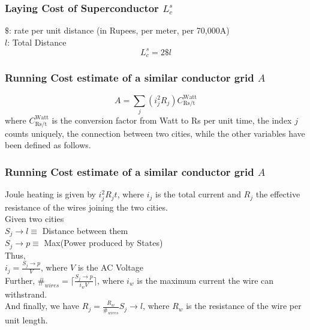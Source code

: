 \documentclass{beamer}
\begin{document}
		\begin{frame}
			\frametitle{Laying Cost of Superconductor $L^s_c$}
				$\$$: rate per unit distance (in Rupees, per meter, per 70,000A) \\
				$l$: Total Distance
				\begin{equation}
					L^s_c=2\$l
				\end{equation}
		\end{frame}
	
		\begin{frame}
			\frametitle{Running Cost estimate of a similar conductor grid $A$}
				\begin{equation}
					A=\sum_j(i_j^2R_j) C^{\text{Watt}}_{\text{Rs/t}}
				\end{equation}
				where $C^{\text{Watt}}_{\text{Rs/t}}$ is the conversion factor from Watt to Rs per unit time, the index $j$ counts uniquely, the connection between two cities, while the other variables have been defined as follows.\\
		\end{frame}

		\begin{frame}
			\frametitle{Running Cost estimate of a similar conductor grid $A$}
				Joule heating is given by $i_j^2R_jt$, where $i_j$ is the total current and $R_j$ the effective resistance of the wires joining the two cities.\\
				Given two cities\\
				$S_j \to l\equiv$ Distance between them\\
				$S_j \to p\equiv$ Max(Power produced by States)\\
				Thus,\\
				$i_j=\frac{S_j \to p}{V}$, where $V$ is the AC Voltage\\
				Further, $\#_{wires}=\lceil{\frac{S_j \to p}{i_wV}}\rceil$, where $i_w$ is the maximum current the wire can withstrand.\\
				And finally, we have $R_j=\frac{R_w}{\#_{wires}}S_j \to l$, where $R_w$ is the resistance of the wire per unit length.
		\end{frame}
\end{document}
